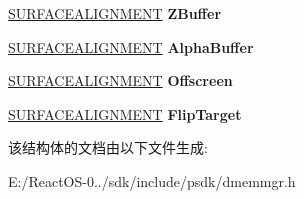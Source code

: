\begin{DoxyCompactItemize}
\hyperlink{struct___s_u_r_f_a_c_e_a_l_i_g_n_m_e_n_t}{S\+U\+R\+F\+A\+C\+E\+A\+L\+I\+G\+N\+M\+E\+NT} {\bfseries Z\+Buffer}
\item 
\mbox{\label{struct___h_e_a_p_a_l_i_g_n_m_e_n_t_ab63f97da0bade4efc344187f5a11c85b}} 
\hyperlink{struct___s_u_r_f_a_c_e_a_l_i_g_n_m_e_n_t}{S\+U\+R\+F\+A\+C\+E\+A\+L\+I\+G\+N\+M\+E\+NT} {\bfseries Alpha\+Buffer}
\item 
\mbox{\label{struct___h_e_a_p_a_l_i_g_n_m_e_n_t_a4e1001c93a8ab18a8761681f9de4ce39}} 
\hyperlink{struct___s_u_r_f_a_c_e_a_l_i_g_n_m_e_n_t}{S\+U\+R\+F\+A\+C\+E\+A\+L\+I\+G\+N\+M\+E\+NT} {\bfseries Offscreen}
\item 
\mbox{\label{struct___h_e_a_p_a_l_i_g_n_m_e_n_t_a1fe1ba4b4eba3cb850a82af2132dcbe8}} 
\hyperlink{struct___s_u_r_f_a_c_e_a_l_i_g_n_m_e_n_t}{S\+U\+R\+F\+A\+C\+E\+A\+L\+I\+G\+N\+M\+E\+NT} {\bfseries Flip\+Target}
\end{DoxyCompactItemize}


该结构体的文档由以下文件生成\+:\begin{DoxyCompactItemize}
\item 
E\+:/\+React\+O\+S-\/0../sdk/include/psdk/dmemmgr.\+h\end{DoxyCompactItemize}
